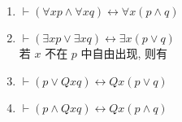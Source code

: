 \documentclass[
    mode=hazy,
    color=blue,
    device=normal,
    lang=cn
]{elegantnote}
\begin{document}
\begin{proposition}
    \hfill
    \begin{enumerate}[label = $\arabic*^\circ$]
        \item $\vdash (\forall x p \land \forall x q)\leftrightarrow \forall x(p\land q)$
        \item $\vdash (\exists x p \lor \exists x q)\leftrightarrow \exists x(p\lor q)$\\
        若 $x$ 不在 $p$ 中自由出现, 则有
        \item $\vdash (p\lor Qxq)\leftrightarrow Qx(p\lor q)$
        \item $\vdash (p\land Qxq)\leftrightarrow Qx(p\land q)$
    \end{enumerate}
\end{proposition}
\end{document}
